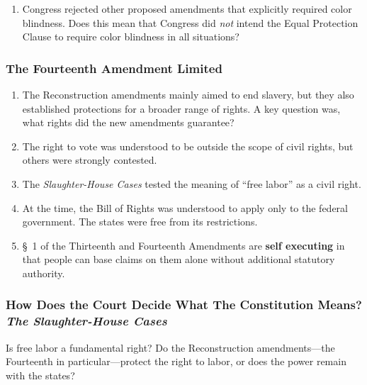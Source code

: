 \begin{enumerate}
\begin{enumerate}
        earlier act. Many of these concerns were justified, as proponents 
        made comments that the amendment's language \emph{should} be construed 
        broadly to end racial discrimination in all forms.\footnote{Casebook 
        pp. 308--09.}
        \item \S\ explicitly overrules \emph{Dred Scott} by establishing 
        birthright citizenship for all people, blacks included.
    \end{enumerate}
    \item Congress rejected other proposed amendments that explicitly required 
    color blindness. Does this mean that Congress did \emph{not} intend the 
    Equal Protection Clause to require color blindness in all situations?
\end{enumerate}

\subsubsection{The Fourteenth Amendment Limited}

\begin{enumerate}
    \item The Reconstruction amendments mainly aimed to end slavery, but they 
    also established protections for a broader range of rights. A key question 
    was, what rights did the new amendments guarantee?
    \item The right to vote was understood to be outside the scope of civil 
    rights, but others were strongly contested.
    \item The \emph{Slaughter-House Cases} tested the meaning of ``free labor'' 
    as a civil right.
    \item At the time, the Bill of Rights was understood to apply only to the 
    federal government. The states were free from its restrictions.
    \item \S\ 1 of the Thirteenth and Fourteenth Amendments are \textbf{self 
    executing} in that people can base claims on them alone without 
    additional statutory authority.
\end{enumerate}

\subsubsection{How Does the Court Decide What The Constitution Means? \emph{The 
Slaughter-House Cases}}

Is free labor a fundamental right? Do the Reconstruction amendments---the 
Fourteenth in particular---protect the right to labor, or does the power 
remain with the states?

